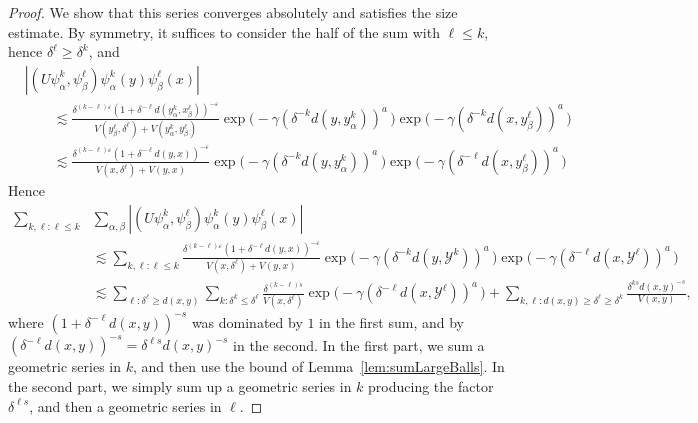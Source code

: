 \documentclass{amsart}
\numberwithin{equation}{section}
\theoremstyle{plain}
\theoremstyle{definition}
\theoremstyle{remark}
\begin{document}
{{{\begin{proof}
We show that this series converges absolutely and satisfies the size estimate.  By symmetry, it suffices to consider the half of the sum with $\ell\leq k$, hence $\delta^\ell\geq\delta^k$, and
\begin{equation*}
\begin{split}
  &{|{(U\psi^k_\alpha,\psi^\ell_\beta)\psi^k_\alpha(y)\psi^\ell_\beta(x)}|} \\
  &\qquad\lesssim\frac{\delta^{(k-\ell)\varepsilon}(1+\delta^{-\ell}d(y^k_\alpha,x^{\ell}_\beta))^{-\varepsilon}}{
     V(y^{\ell}_\beta,\delta^{\ell})+V(y^k_\alpha,y^{\ell}_\beta)}
     \exp\big(-\gamma(\delta^{-k}d(y,y^k_\alpha))^a\, \big) \exp\big(-\gamma(\delta^{-k}d(x,y^\ell_\beta))^a\, \big) \\
  &\qquad\lesssim\frac{\delta^{(k-\ell)\varepsilon}(1+\delta^{-\ell}d(y,x))^{-\varepsilon}}{
     V(x,\delta^{\ell})+V(y,x)}
     \exp\big(-\gamma(\delta^{-k}d(y,y^k_\alpha))^a\, \big) \exp\big(-\gamma(\delta^{-\ell}d(x,y^\ell_\beta))^a\, \big)
\end{split}
\end{equation*}
Hence  
\begin{equation*}
\begin{split}
  \sum_{k,\ell:\ell\leq k} &\sum_{\alpha,\beta}{|{(U\psi^k_\alpha,\psi^\ell_\beta)\psi^k_\alpha(y)\psi^\ell_\beta(x)}|} \\
  &\lesssim\sum_{k,\ell:\ell\leq k}\frac{\delta^{(k-\ell)\varepsilon}(1+\delta^{-\ell}d(y,x))^{-\varepsilon}}{
     V(x,\delta^{\ell})+V(y,x)}
     \exp\big(-\gamma(\delta^{-k}d(y,\mathscr{Y}^k))^a\, \big) \exp\big(-\gamma(\delta^{-\ell}d(x,\mathscr{Y}^\ell))^a\, \big) \\
  &\lesssim\sum_{\ell:\delta^\ell\geq d(x,y)}\sum_{k:\delta^k\leq\delta^\ell}
  \frac{\delta^{(k-\ell)s}}{V(x,\delta^{\ell})} \exp\big(-\gamma(\delta^{-\ell}d(x,\mathscr{Y}^\ell))^a\, \big)
  +\sum_{k,\ell:d(x,y)\geq\delta^{\ell}\geq \delta^k}\frac{\delta^{ks}d(x,y)^{-s}}{V(x,y)},
\end{split}
\end{equation*}
where $(1+\delta^{-\ell}d(x,y))^{-s}$ was dominated by $1$ in the first sum, and by $(\delta^{-\ell}d(x,y))^{-s}=\delta^{\ell s}d(x,y)^{-s}$ in the second. In the first part, we sum a geometric series in $k$, and then use the bound of Lemma~\ref{lem:sumLargeBalls}.
In the second part, we simply sum up a geometric series in $k$ producing the factor $\delta^{\ell s}$, and then a geometric series in $\ell$.
\end{proof}

}}}
\end{document}
